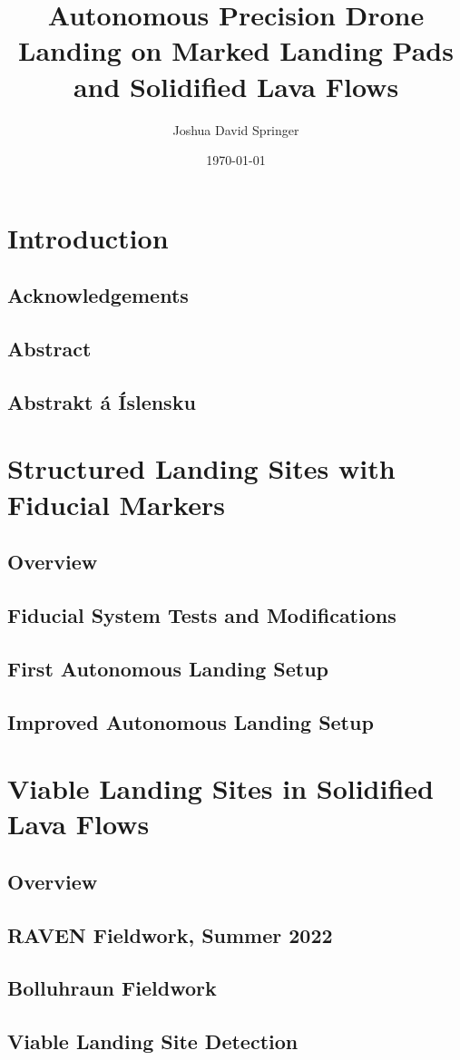 \documentclass[10pt,twoside,b5paper]{book}
\author{Joshua David Springer}
\title{Autonomous Precision Drone Landing on Marked Landing Pads and Solidified Lava Flows}
\date{\specialdate\today}
\begin{document}
	\frontmatter
	
	

	\tableofcontents
	\newpage
	

	\mainmatter
	\chapter{Introduction}
		
		\newpage

		\section{Acknowledgements}
		
		\newpage

		\section{Abstract}
		
		\newpage

		\section{Abstrakt á Íslensku}
		
		\newpage

	\chapter{Structured Landing Sites with Fiducial Markers}
		\section{Overview}
		\section{Fiducial System Tests and Modifications}
		\section{First Autonomous Landing Setup}
		\section{Improved Autonomous Landing Setup}

	\chapter{Viable Landing Sites in Solidified Lava Flows}
		\section{Overview}
		\section{RAVEN Fieldwork, Summer 2022}
		\section{Bolluhraun Fieldwork}
		\section{Viable Landing Site Detection}

	
	
\end{document}
